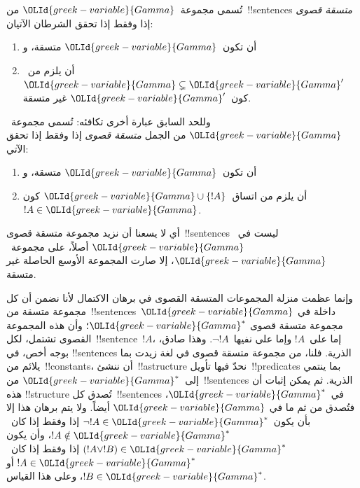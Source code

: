\documentclass[../../../include/open-logic-section]{subfiles}
\begin{document}

\begin{defn}
تُسمى مجموعة~$\OLId{greek-variable}{Gamma}$ من~!!{sentence}s
\emph{متسقة قصوى} إذا وفقط إذا تحقق الشرطان الآتيان:
\begin{enumerate}
\item أن تكون~$\OLId{greek-variable}{Gamma}$ متسقة، و
\item أن يلزم من~$\OLId{greek-variable}{Gamma} \subsetneq \OLId{greek-variable}{Gamma}'$ كون~$\OLId{greek-variable}{Gamma}'$ غير متسقة.
\end{enumerate}
\end{defn}

\begin{explain}
وللحد السابق عبارة أخرى تكافئه: تُسمى مجموعة~$\OLId{greek-variable}{Gamma}$ من الجمل
\emph{متسقة قصوى} إذا وفقط إذا تحقق الآتي:
\begin{enumerate}
\item أن تكون~$\OLId{greek-variable}{Gamma}$ متسقة، و
\item أن يلزم من اتساق~$\OLId{greek-variable}{Gamma} \cup \{ !A \}$ كون~$!A \in \OLId{greek-variable}{Gamma}$.
\end{enumerate}
أي لا يسعنا أن نزيد مجموعة متسقة قصوى~!!{sentence}s ليست في~$\OLId{greek-variable}{Gamma}$
أصلاً، على مجموعة~$\OLId{greek-variable}{Gamma}$، إلا صارت المجموعة الأوسع الحاصلة غير متسقة.
\end{explain}

\begin{explain}
وإنما عظمت منزلة المجموعات المتسقة القصوى في برهان الاكتمال لأنا نضمن أن
كل مجموعة متسقة من~!!{sentence}s~$\OLId{greek-variable}{Gamma}$ داخلة في مجموعة متسقة قصوى
$\OLId{greek-variable}{Gamma}^*$؛ وأن هذه المجموعة القصوى تشتمل، لكل~!!{sentence}~$!A$، إما
على~$!A$ وإما على نفيها~$\lnot !A$. وهذا صادق، بوجه أخص، في
!!{sentence}s الذرية. فلنا، من مجموعة متسقة قصوى في لغة زيدت بما يلائم
من~!!{constant}s، أن ننشئ~!!a{structure} نحدّ فيها تأويل~!!{predicate}s
بما ينتمي إلى~$\OLId{greek-variable}{Gamma}^*$ من~!!{sentence}s الذرية. ثم يمكن إثبات أن هذه
!!{structure} تُصدق كل~!!{sentence}s في~$\OLId{greek-variable}{Gamma}^*$، فتُصدق من ثم ما في
$\OLId{greek-variable}{Gamma}$ أيضاً. ولا يتم برهان هذا إلا بأن يكون~$\lnot !A \in \OLId{greek-variable}{Gamma}^*$
إذا وفقط إذا كان~$!A \notin \OLId{greek-variable}{Gamma}^*$، وأن يكون
$(!A \lor !B) \in \OLId{greek-variable}{Gamma}^*$ إذا وفقط إذا كان~$!A \in \OLId{greek-variable}{Gamma}^*$ أو
$!B \in \OLId{greek-variable}{Gamma}^*$، وعلى هذا القياس.
\end{explain}
\end{document}

